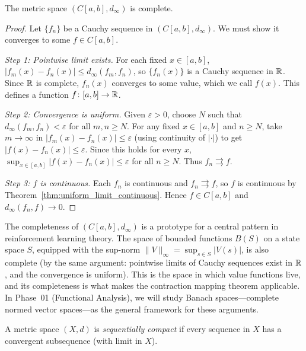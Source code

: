 \documentclass[11pt,a4paper]{article}
\begin{document}
\begin{theorem}
\label{thm:C_complete}
The metric space $(C[a, b], d_\infty)$ is complete.
\end{theorem}

\begin{proof}
Let $\{f_n\}$ be a Cauchy sequence in $(C[a, b], d_\infty)$. We must
show it converges to some $f \in C[a, b]$.

\emph{Step 1: Pointwise limit exists.} For each fixed $x \in [a, b]$,
$|f_m(x) - f_n(x)| \le d_\infty(f_m, f_n)$, so $\{f_n(x)\}$ is a
Cauchy sequence in $\mathbb{R}$. Since $\mathbb{R}$ is complete, $f_n(x)$ converges to
some value, which we call $f(x)$. This defines a function
$f \colon [a, b] \to \mathbb{R}$.

\emph{Step 2: Convergence is uniform.} Given $\varepsilon > 0$, choose
$N$ such that $d_\infty(f_m, f_n) < \varepsilon$ for all $m, n \ge N$.
For any fixed $x \in [a, b]$ and $n \ge N$, take $m \to \infty$ in
$|f_m(x) - f_n(x)| \le \varepsilon$ (using continuity of
$|\cdot|$) to get $|f(x) - f_n(x)| \le \varepsilon$. Since this holds
for every $x$, $\sup_{x \in [a,b]} |f(x) - f_n(x)| \le \varepsilon$
for all $n \ge N$. Thus $f_n \rightrightarrows f$.

\emph{Step 3: $f$ is continuous.} Each $f_n$ is continuous and
$f_n \rightrightarrows f$, so $f$ is continuous by
Theorem~\ref{thm:uniform_limit_continuous}. Hence $f \in C[a, b]$ and
$d_\infty(f_n, f) \to 0$.
\end{proof}

\begin{rlconnection}[title={Completeness of function spaces in RL}]
The completeness of $(C[a,b], d_\infty)$ is a prototype for a central
pattern in reinforcement learning theory. The space of bounded functions
$B(S)$ on a state space $S$, equipped with the sup-norm
$\|V\|_\infty = \sup_{s \in S} |V(s)|$, is also complete (by the same
argument: pointwise limits of Cauchy sequences exist in $\mathbb{R}$, and the
convergence is uniform). This is the space in which value functions
live, and its completeness is what makes the contraction mapping
theorem applicable. In Phase~01 (Functional Analysis), we will study
Banach spaces---complete normed vector spaces---as the general framework
for these arguments.
\end{rlconnection}

\begin{definition}
\label{def:seq_compact}
A metric space $(X, d)$ is \emph{sequentially compact} if every
sequence in $X$ has a convergent subsequence (with limit in $X$).
\end{definition}
\end{document}
